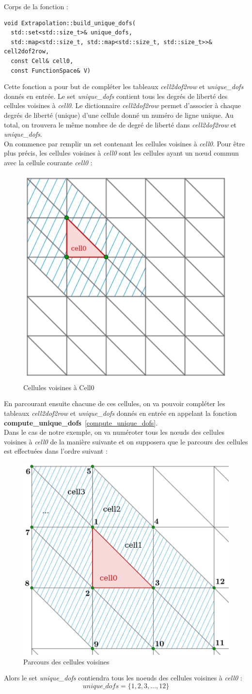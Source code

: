 \documentclass[french]{article}
\begin{document}
	Corps de la fonction :
	
	\begin{lstlisting}
void Extrapolation::build_unique_dofs(
  std::set<std::size_t>& unique_dofs,
  std::map<std::size_t, std::map<std::size_t, std::size_t>>& cell2dof2row,
  const Cell& cell0,
  const FunctionSpace& V)
	\end{lstlisting}

	Cette fonction a pour but de compléter les tableaux \textit{cell2dof2row} et \textit{unique\_dofs} donnés en entrée. Le set \textit{unique\_dofs} contient tous les degrés de liberté des cellules voisines à \textit{cell0}. Le dictionnaire \textit{cell2dof2row} permet d'associer à chaque degrés de liberté (unique) d'une cellule donné un numéro de ligne unique. Au total, on trouvera le même nombre de de degré de liberté dans \textit{cell2dof2row} et \textit{unique\_dofs}.\\
	
	On commence par remplir un set contenant les cellules voisines à \textit{cell0}. Pour être plus précis, les cellules voisines à \textit{cell0} sont les cellules ayant un nœud commun avec la cellule courante \textit{cell0} :
	\begin{figure}[H]
		\centering
		\includegraphics[width=0.25\linewidth]{surrounding_cells.png}
		\caption{Cellules voisines à Cell0}
	\end{figure}
	En parcourant ensuite chacune de ces cellules, on va pouvoir compléter les tableaux \textit{cell2dof2row} et \textit{unique\_dofs} donnés en entrée en appelant la fonction \textbf{compute\_unique\_dofs}~\ref{compute_unique_dofs}. \\
	Dans le cas de notre exemple, on va numéroter tous les nœuds des cellules voisines à \textit{cell0} de la manière suivante et on supposera que le parcours des cellules est effectuées dans l'ordre suivant :
	\begin{figure}[H]
		\centering
		\includegraphics[width=0.25\linewidth]{cell2dof2row.png}
		\caption{Parcours des cellules voisines}
	\end{figure}
	Alors le set \textit{unique\_dofs} contiendra tous les noeuds des cellules voisines à \textit{cell0} : 
	$$unique\_dofs = \{1,2,3,\dots,12\}$$
	
\end{document}
